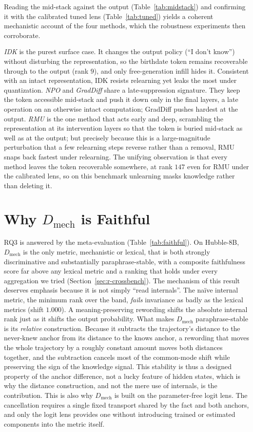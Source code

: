 Reading the mid-stack against the output (Table~\ref{tab:midstack}) and confirming it with the calibrated
tuned lens (Table~\ref{tab:tuned}) yields a coherent mechanistic account of the four methods, which the
robustness experiments then corroborate.

\emph{IDK} is the purest surface case. It changes the output policy (``I don't know'') without disturbing
the representation, so the birthdate token remains recoverable through to the output (rank $9$), and only
free-generation infill hides it. Consistent with an intact representation, IDK resists relearning yet leaks the most under
quantization. \emph{NPO} and \emph{GradDiff} share a late-suppression signature. They keep the token
accessible mid-stack and push it down only in the final layers, a late operation on an otherwise intact
computation; GradDiff pushes hardest at the output. \emph{RMU} is the one method that acts early and deep,
scrambling the representation at its intervention layers so that the token is buried mid-stack as well as at
the output; but precisely because this is a large-magnitude perturbation that a few relearning steps
reverse rather than a removal, RMU snaps back fastest under relearning. The unifying observation is that every method leaves the token recoverable
somewhere, at rank $147$ even for RMU under the calibrated lens, so on this benchmark unlearning masks
knowledge rather than deleting it.

\section{Why \texorpdfstring{$D_\text{mech}$}{D\_mech} is Faithful}
\label{sec:d-faithful}

RQ3 is answered by the meta-evaluation (Table~\ref{tab:faithful}). On Hubble-8B, $D_\text{mech}$ is the only
metric, mechanistic or lexical, that is both strongly discriminative and substantially paraphrase-stable,
with a composite faithfulness score far above any lexical metric and a ranking that holds
under every aggregation we tried (Section~\ref{sec:r-crossbench}). The mechanism of this result deserves
emphasis because it is
not simply ``read internals''. The na\"ive internal metric, the minimum rank over the band, \emph{fails}
invariance as badly as the lexical metrics (shift $1.000$). A meaning-preserving rewording shifts the
absolute internal rank just as it shifts the output probability. What makes $D_\text{mech}$ paraphrase-stable
is its \emph{relative} construction. Because it subtracts the trajectory's distance to the never-knew anchor
from its distance to the knows anchor, a rewording that moves the whole trajectory by a roughly constant
amount moves both distances together, and the subtraction cancels most of the common-mode shift while
preserving the sign of the knowledge signal. This stability is thus a designed property of the anchor
difference, not a lucky feature of hidden states, which is why the distance construction, and not the mere
use of internals,
is the contribution. This is also why $D_\text{mech}$ is built on the parameter-free logit lens. The
cancellation requires a single fixed transport shared by the fact and both anchors, and only the logit lens
provides one without introducing trained or estimated components into the metric itself.

